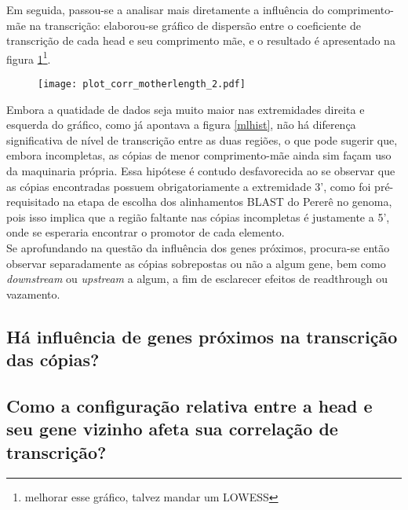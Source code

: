 \documentclass[12pt]{article}
\begin{document}
\begin{multicols}{2}
	Em seguida, passou-se a analisar mais diretamente a influência do comprimento-mãe na transcrição: elaborou-se gráfico de dispersão entre o coeficiente de transcrição de cada head e seu comprimento mãe, e o resultado é apresentado na figura \ref{mlrc}\footnote{melhorar esse gráfico, talvez mandar um LOWESS}.

\begin{figure}[H]
	\centering
	\label{mlrc}
	\texttt{[image: plot\_corr\_motherlength\_2.pdf]}
\end{figure}

Embora a quatidade de dados seja muito maior nas extremidades direita e esquerda do gráfico, como já apontava a figura \ref{mlhist}, não há diferença significativa de nível de transcrição entre as duas regiões, o que pode sugerir que, embora incompletas, as cópias de menor comprimento-mãe ainda sim façam uso da maquinaria própria. Essa hipótese é contudo desfavorecida ao se observar que as cópias encontradas possuem obrigatoriamente a extremidade 3', como foi pré-requisitado na etapa de escolha dos alinhamentos BLAST do Pererê no genoma, pois isso implica que a região faltante nas cópias incompletas é justamente a 5', onde se esperaria encontrar o promotor de cada elemento.\\

Se aprofundando na questão da influência dos genes próximos, procura-se então observar separadamente as cópias sobrepostas ou não a algum gene, bem como \textit{downstream} ou \textit{upstream} a algum, a fim de esclarecer efeitos de readthrough ou vazamento.


\subsection{Há influência de genes próximos na transcrição das cópias?}

\subsection{Como a configuração relativa entre a head e seu gene vizinho afeta sua correlação de transcrição?}


\end{multicols}
\end{document}
